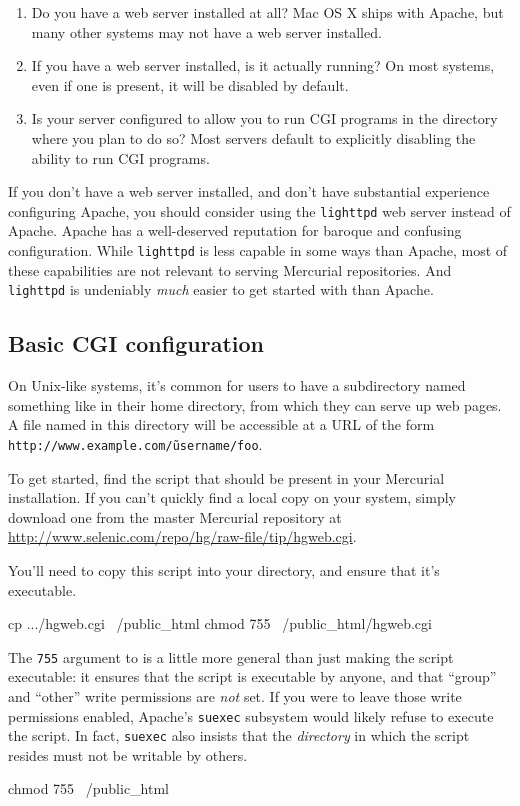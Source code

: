 \begin{enumerate}
\item Do you have a web server installed at all?  Mac OS X ships with
  Apache, but many other systems may not have a web server installed.
\item If you have a web server installed, is it actually running?  On
  most systems, even if one is present, it will be disabled by
  default.
\item Is your server configured to allow you to run CGI programs in
  the directory where you plan to do so?  Most servers default to
  explicitly disabling the ability to run CGI programs.
\end{enumerate}

If you don't have a web server installed, and don't have substantial
experience configuring Apache, you should consider using the
\texttt{lighttpd} web server instead of Apache.  Apache has a
well-deserved reputation for baroque and confusing configuration.
While \texttt{lighttpd} is less capable in some ways than Apache, most
of these capabilities are not relevant to serving Mercurial
repositories.  And \texttt{lighttpd} is undeniably \emph{much} easier
to get started with than Apache.

\subsection{Basic CGI configuration}

On Unix-like systems, it's common for users to have a subdirectory
named something like  in their home directory,
from which they can serve up web pages.  A file named 
in this directory will be accessible at a URL of the form
\texttt{http://www.example.com/\~username/foo}.

To get started, find the  script that should be
present in your Mercurial installation.  If you can't quickly find a
local copy on your system, simply download one from the master
Mercurial repository at
\url{http://www.selenic.com/repo/hg/raw-file/tip/hgweb.cgi}.

You'll need to copy this script into your 
directory, and ensure that it's executable.
\begin{codesample2}
  cp .../hgweb.cgi ~/public_html
  chmod 755 ~/public_html/hgweb.cgi
\end{codesample2}
The \texttt{755} argument to  is a little more general
than just making the script executable: it ensures that the script is
executable by anyone, and that ``group'' and ``other'' write
permissions are \emph{not} set.  If you were to leave those write
permissions enabled, Apache's \texttt{suexec} subsystem would likely
refuse to execute the script.  In fact, \texttt{suexec} also insists
that the \emph{directory} in which the script resides must not be
writable by others.
\begin{codesample2}
  chmod 755 ~/public_html
\end{codesample2}

